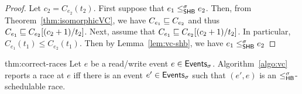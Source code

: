 \begin{proof}
Let $c_2 = C_{e_2}(t_2)$.
First suppose that $e_1 \leq^{\sigma}_{\mathsf{SHB}} e_2$.
Then, from Theorem~\ref{thm:isomorphicVC}, we have $C_{e_1} \sqsubseteq C_{e_2}$
and thus $C_{e_1} \sqsubseteq C_{e_2}[(c_2+1)/t_2]$.
Next, assume that $C_{e_1} \sqsubseteq C_{e_2}[(c_2 + 1)/t_2]$.
In particular, $C_{e_1}(t_1) \leq C_{e_2}(t_1)$.
Then by Lemma~\ref{lem:vc-shb}, we have $e_1 \leq^{\sigma}_{\mathsf{SHB}} e_2$
\end{proof}

\begin{reptheorem}{thm:correct-races}
Let $e$ be a read/write event $e \in \mathsf{Events}_{\sigma}$.
Algorithm~\ref{algo:vc} reports a race at $e$
iff there is an event $e' \in \mathsf{Events}_{\sigma}$ such that $(e', e)$
is an $\leq^{\sigma}_{\mathsf{HB}}$-schedulable race.
\end{reptheorem}

